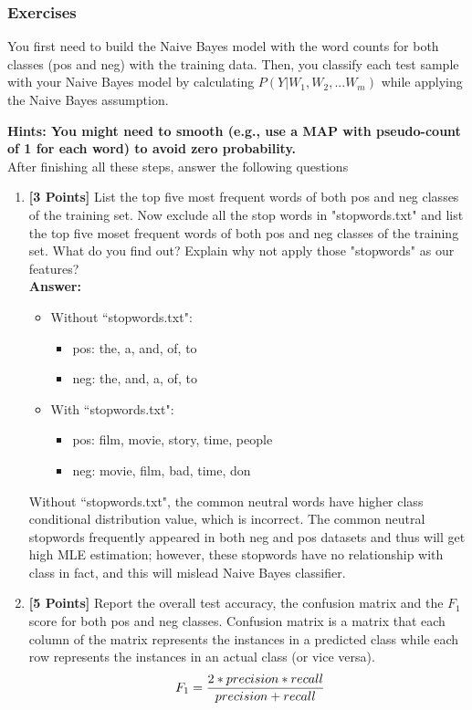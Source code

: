\documentclass{article}
\begin{document}
\subsubsection*{Exercises}
You first need to build the Naive Bayes model with the word counts for both classes (pos and neg) with the training data. Then, you classify each test sample with your Naive Bayes model by calculating  $P(Y | W_1, W_2, ...W_m)$ while applying the Naive Bayes assumption.

 \textbf{Hints: You might need to smooth (e.g., use a MAP with pseudo-count of 1 for each word) to avoid zero probability. }
\\ After finishing all these steps, answer the following questions

\begin{enumerate}
	\item \textbf{[3 Points]} List the top five most frequent words of both pos and neg classes of the training set. Now exclude all the stop words in "stopwords.txt" and list the top five moset frequent words of both pos and neg classes of the training set. What do you find out? Explain why not apply those "stopwords" as our features?\\
	\textbf{Answer:}\\
	\begin{itemize}
		\item Without ``stopwords.txt":
		\begin{itemize}
			\item pos: the, a, and, of, to
			\item neg: the, and, a, of, to
		\end{itemize}
		\item With ``stopwords.txt":
		\begin{itemize}
			\item pos: film, movie, story, time, people
			\item neg: movie, film, bad, time, don
		\end{itemize}
	\end{itemize} 
	Without ``stopwords.txt", the common neutral words have higher class conditional distribution value, which is incorrect. The common neutral stopwords frequently appeared in both neg and pos datasets and thus will get high MLE estimation; however, these stopwords have no relationship with class in fact, and this will mislead Naive Bayes classifier. 
	
 	\item \textbf{[5 Points]} Report the overall test accuracy, the confusion matrix and the $F_1$ score for both pos and neg classes. Confusion matrix is a matrix that each column of the matrix represents the instances in a predicted class while each row represents the instances in an actual class (or vice versa).   
	\begin{equation}\label{eqn:f1score}
	\ F_1 =  {2*precision*recall\over precision + recall}
	\end{equation}
	

\end{enumerate}
\end{document}
